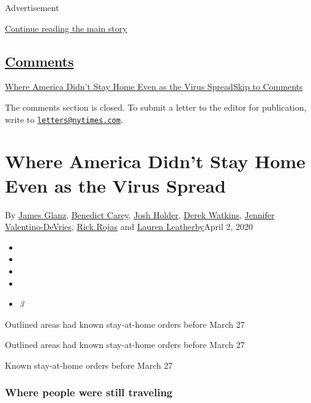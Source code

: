 Advertisement

\protect\hyperlink{after-top}{Continue reading the main story}

\hypertarget{comments}{%
\subsection{\texorpdfstring{\protect\hyperlink{commentsContainer}{Comments}}{Comments}}\label{comments}}

\href{}{Where America Didn't Stay Home Even as the Virus
Spread}\href{}{Skip to Comments}

The comments section is closed. To submit a letter to the editor for
publication, write to
\href{mailto:letters@nytimes.com}{\nolinkurl{letters@nytimes.com}}.

\hypertarget{where-america-didnt-stay-home-even-as-the-virus-spread}{%
\section{Where America Didn't Stay Home Even as the Virus
Spread}\label{where-america-didnt-stay-home-even-as-the-virus-spread}}

By \href{https://www.nytimes.com/by/james-glanz}{James Glanz},
\href{https://www.nytimes.com/by/benedict-carey}{Benedict Carey},
\href{https://www.nytimes.com/by/josh-holder}{Josh Holder},
\href{https://www.nytimes.com/by/derek-watkins}{Derek Watkins},
\href{https://www.nytimes.com/by/jennifer-valentino-devries}{Jennifer
Valentino-DeVries}, \href{https://www.nytimes.com/by/rick-rojas}{Rick
Rojas} and \href{https://www.nytimes.com/by/lauren-leatherby}{Lauren
Leatherby}April 2, 2020

\begin{itemize}
\item
\item
\item
\item
\item
  \emph{3}
\end{itemize}

Outlined areas had known stay-at-home orders before March 27

Outlined areas had known stay-at-home orders before March 27

Known stay-at-home orders before March 27

\hypertarget{where-people-were-still-traveling}{%
\subsubsection{Where people were still
traveling}\label{where-people-were-still-traveling}}

